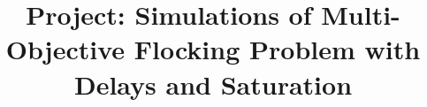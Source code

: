 \documentclass[10pt, conference, compsocconf]{IEEEtran}
\begin{document}
%
\title{Project: Simulations of Multi-Objective Flocking Problem with Delays and Saturation}


\author{
}


% 






\maketitle
\end{document}
